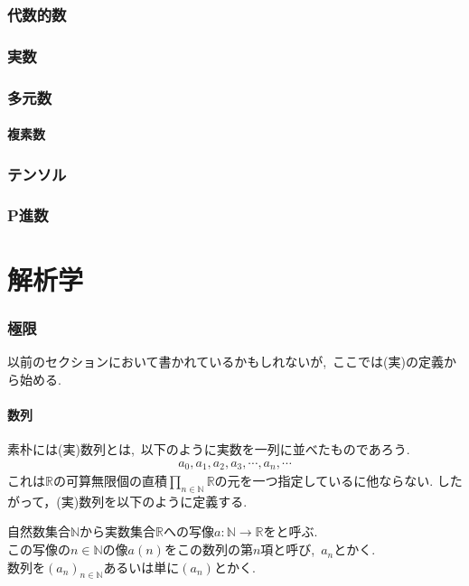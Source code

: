 \documentclass[hyperref,a4paper,12pt]{kininaruki}
\begin{document}
\section{代数的数}
\newpage
\section{実数}
\newpage
\section{多元数}
\subsection{複素数}
\newpage
\section{テンソル}
\newpage
\section{P進数}
\newpage
\part{解析学}
\section{極限}
以前のセクションにおいて書かれているかもしれないが,\, ここでは(実)の定義から始める.
\subsection{数列}
素朴には(実)数列とは,\, 以下のように実数を一列に並べたものであろう.
\begin{align}
    a_{0}, a_{1}, a_{2}, a_{3}, \cdots, a_{n}, \cdots
\end{align}
これは$\mathbb{R}$の可算無限個の直積$\prod_{n\in \mathbb{N}}\mathbb{R}$の元を一つ指定しているに他ならない.
したがって，(実)数列を以下のように定義する.
\begin{shadebox}
    自然数集合$\mathbb{N}$から実数集合$\mathbb{R}$への写像$a:\mathbb{N} \to \mathbb{R}$をと呼ぶ.\\
    この写像の$n\in \mathbb{N}$の像$a(n)$をこの数列の第$n$項と呼び,\, $a_{n}$とかく.\\
    数列を$(a_{n})_{n\in \mathbb{N}}$あるいは単に$(a_{n})$とかく.
\end{shadebox}
\end{document}
